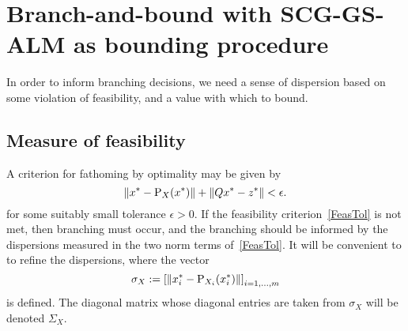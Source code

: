 
\section{Branch-and-bound with SCG-GS-ALM as bounding procedure}

In order to inform branching decisions, we need a sense of dispersion based on some violation of feasibility, and a value with which to bound.

\subsection{Measure of feasibility}

A criterion for fathoming by optimality may be given by
\begin{equation}\label{FeasTol}
\left \| x^* - \text{P}_X(x^*) \right \| + \left \| Qx^*-z^* \right \| < \epsilon.
\end{equation}
for some suitably small tolerance $\epsilon > 0$. If the feasibility criterion~\eqref{FeasTol} is not met, then branching must occur, and the branching should be informed by the dispersions measured in the two norm terms of~\eqref{FeasTol}. It will be convenient to to refine the dispersions, where the vector
$$
\sigma_X :=\left[\left \| x_i^* - \text{P}_{X_i}(x_i^*) \right \| \right]_{i=1,\dots,m}
$$
is defined. The diagonal matrix whose diagonal entries are taken from $\sigma_X$ will be denoted $\Sigma_X$.

